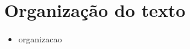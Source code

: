 \section{Organização do texto}
\label{sec:organizacao}

\begin{itemize}
\item organizacao
\end{itemize}
